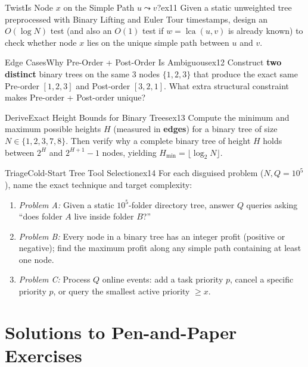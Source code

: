 \documentclass[11pt,a4paper]{article}
\theoremstyle{definition}
\begin{document}
\begin{tryitbox}{Twist}{Is Node $x$ on the Simple Path $u \leadsto v$?}{ex11}
Given a static unweighted tree preprocessed with Binary Lifting and Euler Tour timestamps, design an $O(\log N)$ test (and also an $O(1)$ test if $w = \operatorname{lca}(u, v)$ is already known) to check whether node $x$ lies on the unique simple path between $u$ and $v$.
\end{tryitbox}

\begin{tryitbox}{Edge Cases}{Why Pre-Order + Post-Order Is Ambiguous}{ex12}
Construct \textbf{two distinct} binary trees on the same 3 nodes $\{1, 2, 3\}$ that produce the exact same Pre-order $[1, 2, 3]$ and Post-order $[3, 2, 1]$. What extra structural constraint makes Pre-order + Post-order unique?
\end{tryitbox}

\begin{tryitbox}{Derive}{Exact Height Bounds for Binary Trees}{ex13}
Compute the minimum and maximum possible heights $H$ (measured in \textbf{edges}) for a binary tree of size $N \in \{1, 2, 3, 7, 8\}$. Then verify why a complete binary tree of height $H$ holds between $2^H$ and $2^{H+1} - 1$ nodes, yielding $H_{\min} = \lfloor \log_2 N \rfloor$.
\end{tryitbox}

\begin{tryitbox}{Triage}{Cold-Start Tree Tool Selection}{ex14}
For each disguised problem ($N, Q = 10^5$), name the exact technique and target complexity:
\begin{enumerate}[itemsep=2pt, topsep=2pt]
    \item \emph{Problem A:} Given a static $10^5$-folder directory tree, answer $Q$ queries asking ``does folder $A$ live inside folder $B$?''
    \item \emph{Problem B:} Every node in a binary tree has an integer profit (positive or negative); find the maximum profit along any simple path containing at least one node.
    \item \emph{Problem C:} Process $Q$ online events: add a task priority $p$, cancel a specific priority $p$, or query the smallest active priority $\ge x$.
\end{enumerate}
\end{tryitbox}

\section*{Solutions to Pen-and-Paper Exercises}
\end{document}
